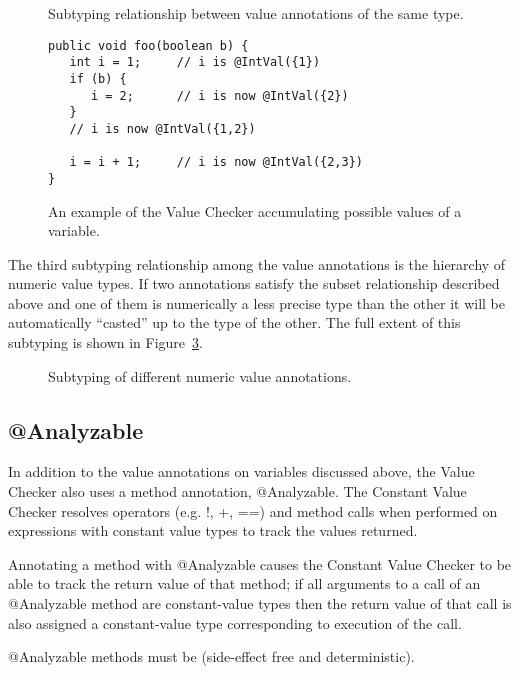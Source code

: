 \begin{figure}
\caption{Subtyping relationship between value annotations of the same type.}
\label{fig-value-subtype}
\end{figure}

\begin{figure}
\begin{Verbatim}
public void foo(boolean b) {
   int i = 1;     // i is @IntVal({1})
   if (b) {  
      i = 2;      // i is now @IntVal({2})
   }        
   // i is now @IntVal({1,2})
   
   i = i + 1;     // i is now @IntVal({2,3})
}
\end{Verbatim}
\caption{An example of the Value Checker accumulating possible values
    of a variable.}
\label{fig-value-multivalue}
\end{figure}

The third subtyping relationship among the value annotations is the
hierarchy of numeric value types. If two annotations satisfy the
subset relationship described above and one of them is numerically a
less precise type than the other it will be automatically ``casted''
up to the type of the other. The full extent of this subtyping is
shown in Figure~\ref{fig-value-subtyping}.

\begin{figure}
\caption{Subtyping of different numeric value annotations.}
\label{fig-value-subtyping}
\end{figure}

\subsection{@Analyzable}
In addition to the value annotations on variables discussed above, the
Value Checker also uses a method annotation, @Analyzable. The Constant
Value Checker resolves operators (e.g. !, +, ==) and method calls when
performed on expressions with constant value types to track the values
returned. 

Annotating a method with @Analyzable causes the Constant Value Checker
to be able to track the return value of that method; if all arguments
to a call of an @Analyzable method are constant-value types then the
return value of that call is also assigned a constant-value type
corresponding to execution of the call.

@Analyzable methods must
be  (side-effect free and
deterministic).

